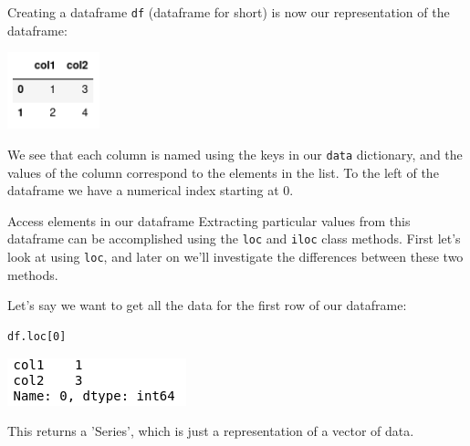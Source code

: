 \documentclass[10pt]{beamer}
\begin{document}
\begin{frame}[label={sec:org9900b09},fragile]{Creating a dataframe}
 \texttt{df} (dataframe for short) is now our representation of the dataframe:

\begin{center}
\includegraphics[width=0.2\textwidth]{images/simple_dataframe.png}
\end{center}

We see that each column is named using the keys in our \texttt{data} dictionary, and the
values of the column correspond to the elements in the list. To the left of the
dataframe we have a numerical index starting at 0.
\end{frame}

\begin{frame}[label={sec:org4ee206e},fragile]{Access elements in our dataframe}
 Extracting particular values from this dataframe can be accomplished using the
\texttt{loc} and \texttt{iloc} class methods. First let's look at using \texttt{loc}, and later on we'll
investigate the differences between these two methods.

Let's say we want to get all the data for the first row of our dataframe:

\begin{verbatim}
df.loc[0]
\end{verbatim}

\begin{center}
\includegraphics[scale=0.5]{images/series.png}
\end{center}

This returns a 'Series', which is just a representation of a vector of data.
\end{frame}
\end{document}
